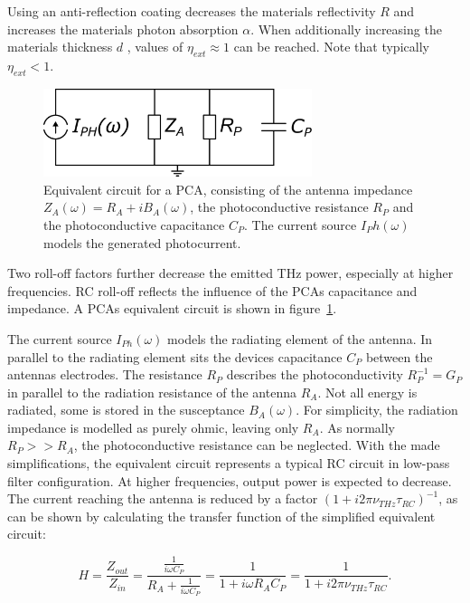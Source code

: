 Using an anti-reflection coating decreases the materials reflectivity $R$ and increases the materials photon absorption $\alpha$. When additionally increasing the materials thickness $d$ , values of $\eta_{ext} \approx 1$ can be reached. Note that typically $\eta_{ext} < 1$. 

\begin{figure}[ht]
	\centering
	\includegraphics[width=0.7\textwidth]{figures/eq_circuit_PCA.pdf}
	\captionsetup{width=\textwidth}
	\caption{Equivalent circuit for a PCA, consisting of the antenna impedance $Z_A(\omega) = R_A + iB_A(\omega)$, the photoconductive resistance $R_P$ and the photoconductive capacitance $C_P$. The current source $I_Ph(\omega)$ models the generated photocurrent.}
	\label{PCA_eq}
\end{figure}


Two roll-off factors further decrease the emitted THz power, especially at higher frequencies. RC roll-off reflects the influence of the PCAs capacitance and impedance. A PCAs equivalent circuit \cite{fernandezolveraInternationalSystemUnits2019,collinLimitationsTheveninNorton2003} is shown in figure~\ref{PCA_eq}.

The current source $I_{Ph}(\omega)$ models the radiating element of the antenna. In parallel to the radiating element sits the devices capacitance $C_P$ between the antennas electrodes. The resistance $R_P$ describes the photoconductivity $R_P^{-1} = G_P$ in parallel to the radiation resistance of the antenna $R_A$. Not all energy is radiated, some is stored in the susceptance $B_A(\omega)$. For simplicity, the radiation impedance is modelled as purely ohmic, leaving only $R_A$. As normally $R_{P} >> R_A$, the photoconductive resistance can be neglected.  With the made simplifications, the equivalent circuit represents a typical RC circuit in low-pass filter configuration. At higher frequencies, output power is expected to decrease. The current reaching the antenna is reduced by a factor $(1 + i2\pi \nu_{THz}\tau_{RC})^{-1}$, as can be shown by calculating the transfer function of the simplified equivalent circuit: 

\begin{equation}
    H = \frac{Z_{out}}{Z_{in}} = \frac{\frac{1}{i\omega C_P}}{R_A + \frac{1}{i\omega C_P}} = \frac{1}{1 + i\omega R_A C_P} = \frac{1}{1 + i 2\pi \nu_{THz} \tau_{RC}}.    
\end{equation}


